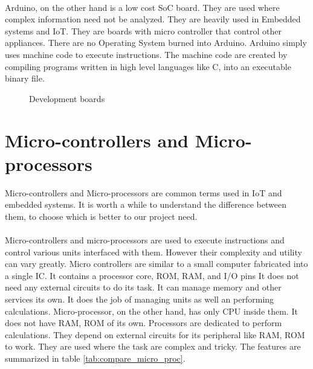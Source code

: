 \paragraph{ } Arduino, on the other hand is a low cost \ac{SoC} board. They are used where complex information need not be analyzed. They are heavily used in Embedded systems and \ac{IoT}. They are boards with micro controller that control other appliances. There are no Operating System burned into Arduino. Arduino simply uses machine code to execute instructions. The machine code are created by compiling programs written in high level languages like C, into an executable binary file.

\begin{figure}
    \centering
    \caption{Development boards}
\end{figure}

\section{Micro-controllers and Micro-processors}
Micro-controllers and Micro-processors are common terms used in \ac{IoT} and embedded systems. It is worth a while to understand the difference between them, to choose which is better to our project need.
\paragraph{ } Micro-controllers and micro-processors are used to execute instructions and control various units interfaced with them. However their complexity and utility can vary greatly. Micro controllers are similar to a small computer fabricated into a single \ac{IC}. It contains a processor core, ROM, RAM, and I/O pins It does not need any external circuits to do its task. It can manage memory and other services its own. It does the job of managing units as well an performing calculations. Micro-processor, on the other hand, has only CPU inside them. It does not have RAM, ROM of its own. Processors are dedicated to perform calculations. They depend on external circuits for its peripheral like RAM, ROM to work. They are used where the task are complex and tricky. The features are summarized in table \ref{tab:compare_micro_proc}.

